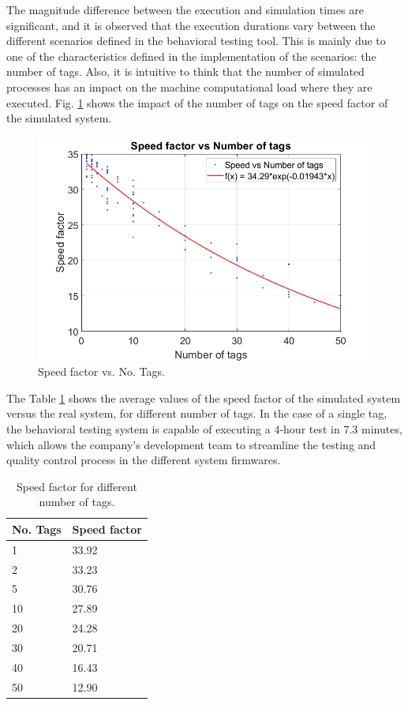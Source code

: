 \documentclass[journal]{IEEEtran}	%
\begin{document}
The magnitude difference between the execution and simulation times are significant, and it is observed that the execution durations vary between the different scenarios defined in the behavioral testing tool. This is mainly due to one of the characteristics defined in the implementation of the scenarios: the number of tags. Also, it is intuitive to think that the number of simulated processes has an impact on the machine computational load where they are executed. Fig. \ref{fig:speed} shows the impact of the number of tags on the speed factor of the simulated system.

\begin{figure}[t!]
\centering
\includegraphics[width=0.95\columnwidth]{speedFactor2.png}
\caption{Speed factor vs. No. Tags.}
\label{fig:speed}
\end{figure}

The Table \ref{tab:speed} shows the average values of the speed factor of the simulated system versus the real system, for different number of tags. In the case of a single tag, the behavioral testing system is capable of executing a 4-hour test in  7.3 minutes, which allows the company's development team to streamline the testing and quality control process in the different system firmwares.

\begin{table}[h!]
    \renewcommand{\arraystretch}{1.25}		%
    \centering
    \caption{Speed factor for different number of tags.}	%
    \label{tab:speed}
    \begin{tabular}{l|l}					%
    \hline \hline
    \textbf{No. Tags}        &    \textbf{Speed factor}\\
    \hline
    1       &   33.92\\
    2       &   33.23\\
    5       &   30.76\\
    10      &   27.89\\
    20      &   24.28\\
    30      &   20.71\\
    40      &   16.43\\
    50      &   12.90\\
    \hline \hline
    \end{tabular}
\end{table}
\end{document}
